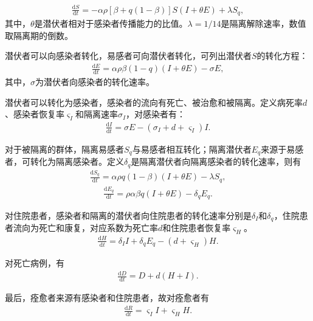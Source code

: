 \documentclass{whutmod}
\begin{document}
			\begin{gather}
			\frac{\mathrm{d} S}{\mathrm{d} t}=-\alpha\rho [\beta +q(1-\beta)]S(I+\theta E)+\lambda S_{q},
			\end{gather}
			其中，$\theta $是潜伏者相对于感染者传播能力的比值。$\lambda=1/14$是隔离解除速率，数值取隔离期的倒数。
		
			潜伏者可以向感染者转化，易感者可向潜伏者转化，可列出潜伏者$S$的转化方程：
			\begin{gather}
			\frac{\mathrm{d} E}{\mathrm{d} t}=\alpha\rho\beta(1-q) (I+\theta E)-\sigma E,
			\end{gather}
			其中，$\sigma$为潜伏者向感染者的转化速率。
			
			潜伏者可以转化为感染者，感染者的流向有死亡、被治愈和被隔离。定义病死率$d$、感染者恢复率$\varsigma_I$和隔离速率$\sigma_I$，对感染者有：
			\begin{gather}
			\frac{\mathrm{d} I}{\mathrm{d} t}=\sigma E-(\sigma_I+d+\varsigma_I)I.
			\end{gather}
			
			对于被隔离的群体，隔离易感者$S_q$与易感者相互转化；隔离潜伏者$E_q$来源于易感者，可转化为隔离感染者。定义$\delta_q$是隔离潜伏者向隔离感染者的转化速率，则有
			\begin{gather}
			\frac{\mathrm{d} S_q}{\mathrm{d} t}=\alpha\rho q(1-\beta)(I+\theta E)-\lambda S_q,
			\end{gather}
			\begin{gather}
			\frac{\mathrm{d} E_q}{\mathrm{d} t}=\rho \alpha \beta q(I+\theta E)-\delta_q E_q.
			\end{gather}
			
			对住院患者，感染者和隔离的潜伏者向住院患者的转化速率分别是$\delta_I$和$\delta_q$，住院患者流向为死亡和康复，对应系数为死亡率$d$和住院患者恢复率$\varsigma_H$。
			\begin{gather}
			\frac{\mathrm{d}H }{\mathrm{d} t}=\delta_I I+ \delta_q E_q-(d+\varsigma_H )H.
			\end{gather}
			
			对死亡病例，有
			\begin{gather}
			\frac{\mathrm{d} D}{\mathrm{d} t}= D + d(H+I).
			\end{gather}
			
			最后，痊愈者来源有感染者和住院患者，故对痊愈者有
			\begin{gather}
			\frac{\mathrm{d} R}{\mathrm{d} t}=\varsigma_I I+\varsigma_H H.
			\end{gather}
			
\end{document}
